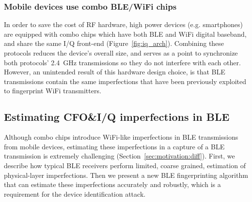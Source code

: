 \subsubsection*{Mobile devices use combo BLE/WiFi chips}
%
In order to save the cost of RF hardware, high power devices (e.g. smartphones) are
equipped with combo chips which have both BLE and WiFi digital baseband, and
share the same I/Q front-end 
(Figure~\ref{fig:iq_arch}).
%
Combining these protocols reduces the device's overall size, and serves as a
point to synchronize both protocols' 2.4~GHz transmissions so they do not
interfere with each other.
%
However, an unintended result of this hardware design choice, is that BLE
transmissions contain the same imperfections that have been previously exploited to fingerprint WiFi transmitters.



\subsection{Estimating CFO\&I/Q imperfections in BLE} %
\label{sec:methodology1}

%
%
Although combo chips introduce WiFi-like imperfections in BLE transmissions
from mobile devices, estimating these imperfections in a capture of a BLE
transmission is extremely challenging (Section~\ref{sec:motivation:diff}).
%
%
%
First, we describe how typical BLE receivers perform limited, coarse grained,
estimation of physical-layer imperfections.
%
Then we present a new BLE fingerprinting algorithm that can estimate these
imperfections accurately and robustly, which is a requirement for the device identification attack.

